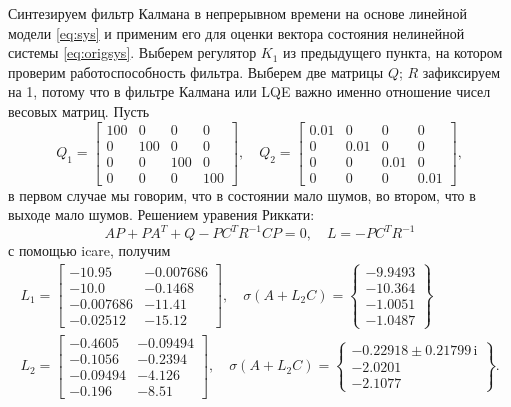 Синтезируем фильтр Калмана в непрерывном времени на основе линейной 
модели \eqref{eq:sys} и применим его для оценки вектора 
состояния нелинейной системы \eqref{eq:origsys}. 
Выберем регулятор $K_1$ из предыдущего
пункта, на котором проверим работоспособность фильтра.
Выберем две матрицы $Q$; $R$ зафиксируем на 1, потому что в фильтре Калмана
или LQE важно именно отношение чисел весовых матриц. Пусть
\begin{equation*}
    Q_1=\begin{bmatrix}
        100 & 0 & 0 & 0 \\
        0 & 100 & 0 & 0 \\
        0 & 0 & 100 & 0 \\
        0 & 0 & 0 & 100
    \end{bmatrix},\quad
    Q_2=\begin{bmatrix}
        0.01 & 0 & 0 & 0 \\
        0 & 0.01 & 0 & 0 \\
        0 & 0 & 0.01 & 0 \\
        0 & 0 & 0 & 0.01
    \end{bmatrix},
\end{equation*}
в первом случае мы говорим, что в состоянии мало шумов, во втором, что в
выходе мало шумов. Решением уравения Риккати:
\begin{equation*}
    AP+PA^T+Q-PC^TR^{-1}CP=0,\quad L=-PC^TR^{-1}
\end{equation*}
с помощью icare, получим
\begin{gather*}
        L_1=\begin{bmatrix}
-10.95 & -0.007686\\
-10.0 & -0.1468\\
-0.007686 & -11.41\\
-0.02512 & -15.12
    \end{bmatrix},\quad
    \sigma(A+L_2C)=\left\{ 
\begin{array}{c}
-9.9493\\
-10.364\\
-1.0051\\
-1.0487
\end{array}
     \right\}\\
             L_2=\begin{bmatrix}
-0.4605 & -0.09494\\
-0.1056 & -0.2394\\
-0.09494 & -4.126\\
-0.196 & -8.51
    \end{bmatrix},\quad
    \sigma(A+L_2C)=\left\{ 
\begin{array}{c}
-0.22918\pm0.21799\,\mathrm{i}\\
-2.0201\\
-2.1077
\end{array}
     \right\}.
\end{gather*}
